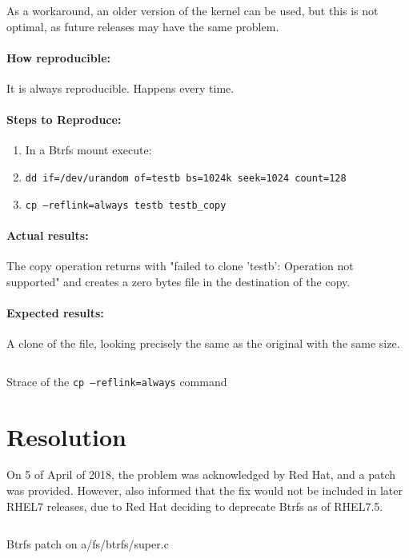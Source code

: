 As a workaround, an older version of the kernel can be used, but this is not optimal, as future releases may have the same problem.

\paragraph{How reproducible:}

It is always reproducible. Happens every time.

\paragraph{Steps to Reproduce:}

\begin{enumerate}
	\item In a Btrfs mount execute:
	\item \texttt{dd if=/dev/urandom of=testb bs=1024k seek=1024 count=128}
	\item \texttt{cp --reflink=always testb testb\_copy}
\end{enumerate}

\paragraph{Actual results:}
The copy operation returns with "failed to clone 'testb': Operation not supported" and creates a zero bytes file in the destination of the copy.

\paragraph{Expected results:}

A clone of the file, looking precisely the same as the original with the same size.

\begin{listing}[ht]
\inputminted{bash}{./Chapters/Code/annex3_strace.sh}
\caption{Strace of the \texttt{cp --reflink=always} command}
\label{listing:bug_strace}
\end{listing}


\section{Resolution}
\label{sec:resolution}
On 5 of April of 2018, the problem was acknowledged by Red Hat, and a patch was provided. However, also informed that the fix would not be included in later RHEL7 releases, due to Red Hat deciding to deprecate Btrfs as of RHEL7.5.

\begin{listing}[ht]
\inputminted{diff}{./Chapters/Code/annex3_btrfspatch.diff}
\caption{Btrfs patch on a/fs/btrfs/super.c}
\label{listing:bug_btrfsdiff}
\end{listing}
